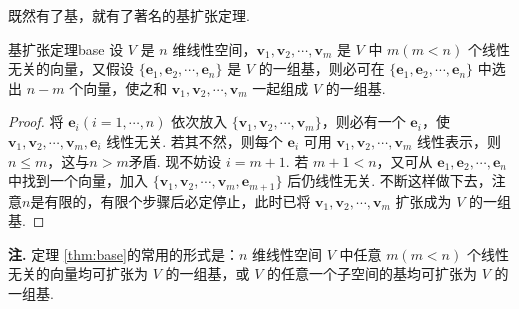 \documentclass[12pt, a4paper,newtx]{ctexart}
\newenvironment{remark}{\dbend\textbf{注. }}{}{}
\begin{document}
既然有了基，就有了著名的基扩张定理. 
\begin{theorem}{基扩张定理}{base}
	设 $V$ 是 $n$ 维线性空间，$\bm v_1, \bm v_2, \cdots, \bm v_m$ 是 $V$ 中 $m (m < n)$ 个线性无关的向量，又假设 $\{\bm e_1, \bm e_2, \cdots, \bm e_n\}$ 是 $V$ 的一组基，则必可在 $\{\bm e_1, \bm e_2, \cdots, \bm e_n\}$ 中选出 $n-m$ 个向量，使之和 $\bm v_1, \bm v_2, \cdots, \bm v_m$ 一起组成 $V$ 的一组基. 
\end{theorem}
\begin{proof}
	将 $\bm e_i (i = 1, \cdots, n)$ 依次放入 $\{\bm v_1, \bm v_2, \cdots, \bm v_m\}$，则必有一个 $\bm e_i$，使 $\bm v_1, \bm v_2, \cdots, \bm v_m, \bm e_i$ 线性无关. 若其不然，则每个 $\bm e_i$ 可用 $\bm v_1, \bm v_2, \cdots, \bm v_m$ 线性表示，则$n\leqslant m$，这与$n>m$矛盾. 现不妨设 $i = m + 1$. 若 $m + 1 < n$，又可从 $\bm e_1, \bm e_2, \cdots, \bm e_n$ 中找到一个向量，加入 $\{\bm v_1, \bm v_2, \cdots, \bm v_m, \bm e_{m+1}\}$ 后仍线性无关. 不断这样做下去，注意$n$是有限的，有限个步骤后必定停止，此时已将 $\bm v_1, \bm v_2, \cdots, \bm v_m$ 扩张成为 $V$ 的一组基. 
\end{proof}
\begin{remark}
	定理 \ref{thm:base}的常用的形式是：$n$ 维线性空间 $V$ 中任意 $m (m < n)$ 个线性无关的向量均可扩张为 $V$ 的一组基，或 $V$ 的任意一个子空间的基均可扩张为 $V$ 的一组基. 
\end{remark}
\end{document}
